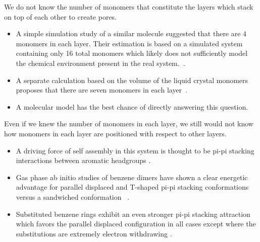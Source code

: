 \documentclass{article}
\begin{document}
  We do not know the number of monomers that constitute the layers which stack
  on top of each other to create pores.
  \begin{itemize}
    \item A simple simulation study of a similar molecule 
suggested
    that there are 4 monomers in each layer. Their estimation is based on a
    simulated system containing only 16 total monomers which likely does not sufficiently
    model the chemical environment present in the real system.~\cite{zhu_methacrylated_2006}. 
    \item A separate calculation based on the volume of the liquid crystal monomers proposes
    that there are seven monomers in each layer~\cite{resel_structural_2000}. 
    \item A molecular model has the best chance of directly answering this question.
  \end{itemize}
    
    Even if we knew the number of monomers in each layer, we still would not know how 
    monomers in each layer are positioned with respect to other layers. 
    \begin{itemize}
      \item A driving force of self assembly in this system is thought to be pi-pi
      stacking interactions between aromatic headgroups \cite{gazit_possible_2002}. 
      \item Gas phase ab initio studies of benzene dimers have shown a clear energetic
      advantage for parallel displaced and T-shaped pi-pi stacking conformations versus a
      sandwiched conformation ~\cite{sinnokrot_estimates_2002}.
      \item Substituted benzene rings exhibit an even stronger pi-pi stacking 
      attraction which favors the parallel displaced configuration in all cases
      except where the substitutions are extremely electron withdrawing
      \cite{waller_hybrid_2006,ringer_effect_2006}.
    \end{itemize}
    
\end{document}
